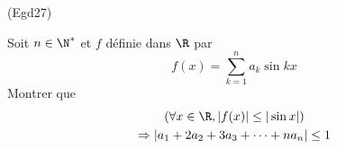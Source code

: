 \begin{tiny}(Egd27)\end{tiny} Soit $n\in\N^*$ et $f$ définie dans $\R$ par
\begin{displaymath}
 f(x) = \sum_{k=1}^na_k\sin kx
\end{displaymath}
Montrer que
\begin{multline*}
 \left(\forall x \in \R, |f(x)|\leq |\sin x| \right) \\
\Rightarrow
|a_1 + 2a_2 + 3a_3+\cdots+na_n|\leq 1 
\end{multline*}

 
